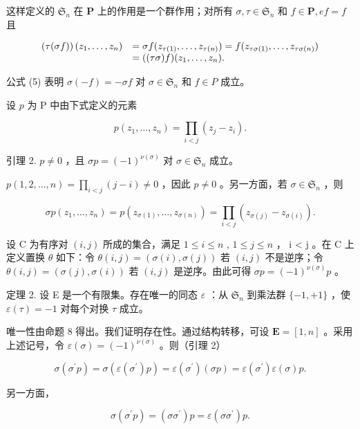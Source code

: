 这样定义的 \(\mathfrak{S}_n\) 在 \(\mathbf{P}\) 上的作用是一个群作用；对所有 \(\sigma, \tau \in \mathfrak{S}_n\) 和 \(f \in \mathbf{P}, ef = f\) 且

\[
\begin{array}{r l} \left(\tau (\sigma f)\right) (z _ {1}, \dots , z _ {n}) & = \sigma f (z _ {\tau (1)}, \dots , z _ {\tau (n)}) = f (z _ {\tau \sigma (1)}, \dots , z _ {\tau \sigma (n)}) \\ & = ((\tau \sigma) f) (z _ {1}, \dots , z _ {n}). \end{array}
\]

公式 (5) 表明 \(\sigma(-f) = -\sigma f\) 对 \(\sigma \in \mathfrak{S}_n\) 和 \(f \in P\) 成立。

设 \(p\) 为 P 中由下式定义的元素

\[
p (z _ {1}, \dots , z _ {n}) = \prod_ {i <   j} (z _ {j} - z _ {i}).\tag{6}
\]

引理 2. \(p \neq 0\) ，且 \(\sigma p = (-1)^{\nu(\sigma)}\) 对 \(\sigma \in \mathfrak{S}_n\) 成立。

\(p(1,2,\ldots,n) = \prod_{i < j}(j - i)\neq 0\) ，因此 \(p\neq 0\) 。另一方面，若 \(\sigma \in \mathfrak{S}_n\) ，则

\[
\sigma p (z _ {1}, \dots , z _ {n}) = p (z _ {\sigma (1)}, \dots , z _ {\sigma (n)}) = \prod_ {i <   j} (z _ {\sigma (j)} - z _ {\sigma (i)}).
\]

设 C 为有序对 \((i,j)\) 所成的集合，满足 \(1 \leqslant i \leqslant n\) , \(1 \leqslant j \leqslant n\) ， i \textless{} j 。在 C 上定义置换 \(\theta\) 如下：令 \(\theta(i,j) = (\sigma(i), \sigma(j))\) 若 \((i,j)\) 不是逆序；令 \(\theta(i,j) = (\sigma(j), \sigma(i))\) 若 \((i,j)\) 是逆序。由此可得 \(\sigma p = (-1)^{\nu(\sigma)} p\) 。

定理 2. 设 E 是一个有限集。存在唯一的同态 \(\varepsilon\) ：从 \(\mathfrak{S}_n\) 到乘法群 \(\{-1, +1\}\) ，使 \(\varepsilon(\tau) = -1\) 对每个对换 \(\tau\) 成立。

唯一性由命题 8 得出。我们证明存在性。通过结构转移，可设 \(\mathbf{E} = [1, n]\) 。采用上述记号，令 \(\varepsilon(\sigma) = (-1)^{\nu(\sigma)}\) 。则（引理 2）

\[
\sigma (\sigma^ {\prime} p) = \sigma (\varepsilon (\sigma^ {\prime}) p) = \varepsilon (\sigma^ {\prime}) (\sigma p) = \varepsilon (\sigma^ {\prime}) \varepsilon (\sigma) p.
\]

另一方面，

\[
\sigma (\sigma^ {\prime} p) = (\sigma \sigma^ {\prime}) p = \varepsilon (\sigma \sigma^ {\prime}) p.
\]

